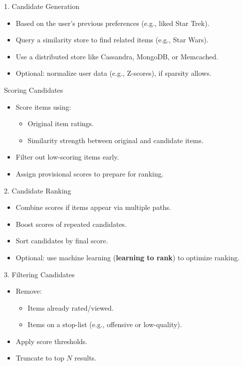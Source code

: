 \documentclass{beamer}
\begin{document}
\begin{frame}{1. Candidate Generation}
\begin{itemize}
    \item Based on the user's previous preferences (e.g., liked Star Trek).
    \item Query a similarity store to find related items (e.g., Star Wars).
    \item Use a distributed store like Cassandra, MongoDB, or Memcached.
    \item Optional: normalize user data (e.g., Z-scores), if sparsity allows.
\end{itemize}
\end{frame}

\begin{frame}{Scoring Candidates}
\begin{itemize}
    \item Score items using:
    \begin{itemize}
        \item Original item ratings.
        \item Similarity strength between original and candidate items.
    \end{itemize}
    \item Filter out low-scoring items early.
    \item Assign provisional scores to prepare for ranking.
\end{itemize}
\end{frame}

\begin{frame}{2. Candidate Ranking}
\begin{itemize}
    \item Combine scores if items appear via multiple paths.
    \item Boost scores of repeated candidates.
    \item Sort candidates by final score.
    \item Optional: use machine learning (\textbf{learning to rank}) to optimize ranking.
\end{itemize}
\end{frame}

\begin{frame}{3. Filtering Candidates}
\begin{itemize}
    \item Remove:
    \begin{itemize}
        \item Items already rated/viewed.
        \item Items on a stop-list (e.g., offensive or low-quality).
    \end{itemize}
    \item Apply score thresholds.
    \item Truncate to top $N$ results.
\end{itemize}
\end{frame}
\end{document}
